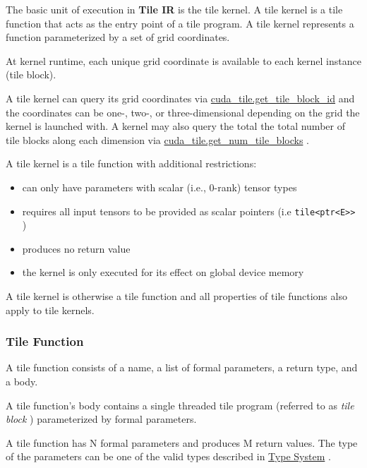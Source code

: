 \documentclass{article}
\begin{document}
The basic unit of execution in \textbf{Tile IR} is the tile kernel. A tile kernel is a tile function that acts as the entry point of a tile program. A tile kernel represents a function parameterized by a set of grid coordinates.

At kernel runtime, each unique grid coordinate is available to each kernel instance (tile block).

A tile kernel can query its grid coordinates via \href{https://docs.nvidia.com/cuda/tile-ir/latest/sections/operations.html#op-cuda-tile-get-tile-block-id}{cuda\_tile.get\_tile\_block\_id} and the coordinates can be one-, two-, or three-dimensional depending on the grid the kernel is launched with. A kernel may also query the total the total number of tile blocks along each dimension via \href{https://docs.nvidia.com/cuda/tile-ir/latest/sections/operations.html#op-cuda-tile-get-num-tile-blocks}{cuda\_tile.get\_num\_tile\_blocks} .


A tile kernel is a tile function with additional restrictions:


\begin{itemize}
\item can only have parameters with scalar (i.e., 0-rank) tensor types
\item requires all input tensors to be provided as scalar pointers (i.e \texttt{tile<ptr<E>>} )
\item produces no return value
\item the kernel is only executed for its effect on global device memory

\end{itemize}
A tile kernel is otherwise a tile function and all properties of tile functions also apply to tile kernels.



\subsubsection{Tile Function}

A tile function consists of a name, a list of formal parameters, a return type, and a body.

A tile function's body contains a single threaded tile program (referred to as \textit{tile block} ) parameterized by formal parameters.


A tile function has N formal parameters  and produces M return values. The type of the parameters can be one of the valid types described in \href{https://docs.nvidia.com/cuda/tile-ir/latest/sections/types.html#section-types}{Type System} .
\end{document}
